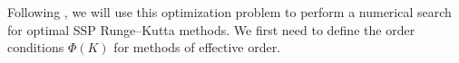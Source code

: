 Following \cite{Ketcheson2008, Ketcheson2009}, we will use this optimization problem to perform a numerical search for optimal SSP Runge--Kutta methods.
We first need to define the order conditions $\Phi(K)$ for methods of effective order.




